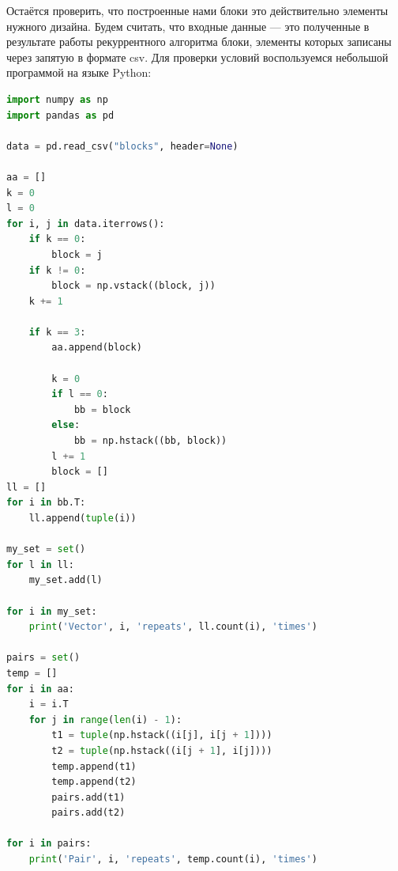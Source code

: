 \documentclass[12pt]{article}
\begin{document}
Остаётся проверить, что построенные нами блоки это действительно элементы нужного дизайна. Будем считать, что входные данные — это полученные в результате работы рекуррентного алгоритма блоки, элементы которых записаны через запятую в формате csv. Для проверки условий воспользуемся небольшой программой на языке Python:
\begin{lstlisting}[language=Python]
import numpy as np
import pandas as pd

data = pd.read_csv("blocks", header=None)

aa = []
k = 0
l = 0
for i, j in data.iterrows():
    if k == 0:
        block = j
    if k != 0:
        block = np.vstack((block, j))
    k += 1

    if k == 3:
        aa.append(block)

        k = 0
        if l == 0:
            bb = block
        else:
            bb = np.hstack((bb, block))
        l += 1
        block = []
ll = []
for i in bb.T:
    ll.append(tuple(i))

my_set = set()
for l in ll:
    my_set.add(l)

for i in my_set:
    print('Vector', i, 'repeats', ll.count(i), 'times')

pairs = set()
temp = []
for i in aa:
    i = i.T
    for j in range(len(i) - 1):
        t1 = tuple(np.hstack((i[j], i[j + 1])))
        t2 = tuple(np.hstack((i[j + 1], i[j])))
        temp.append(t1)
        temp.append(t2)
        pairs.add(t1)
        pairs.add(t2)

for i in pairs:
    print('Pair', i, 'repeats', temp.count(i), 'times')
\end{lstlisting}\leavevmode \\\\\\\\\\\\
\end{document}
